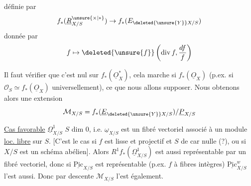 définie par
\[
f_*(\underline R^{\unsure{\times|*}}_{X/S})\to f_*(E_{\deleted{\unsure{Y}}X/S})
\]
donnée par
\[
f\mapsto\deleted{\unsure{f}}\left(\mathrm{div}\,f,\frac{df}{f}\right)
\]

Il faut vérifier que c'est nul sur $f_*(\underline O^*_X)$, cela marche si  $f_*(\underline O_X)$  (p.ex. si $\mathcal O_S\simeq f_*(\underline O_X)$ universellement), ce que nous allons supposer.
Nous obtenons alors une extension
\[
\mathcal M_{X/S}=f_*(\underline E_{\deleted{\unsure{Y}}X/S})/\underline P_{X/S}
\]

\uline{Cas favorable} $\underline{\Omega}^1_{X/S}$  $S$  dim $0$, i.e. $\underline{\omega}_{X/S}$ est un fibré vectoriel associé à un module \uline{loc. libre} sur $S$. [C'est le cas si $f$ est lisse et projectif et $S$ de car nulle (?), ou si $X/S$ est un schéma abélien]. Alors $R^1 f_*(\underline{\Omega}^1_{X/S})$ est aussi représentable par un fibré vectoriel, donc si $\underline{\mathrm{Pic}}_{X/S}$ est représentable (p.ex. $f$ à fibres  intègres) $\underline{\mathrm{Pic}}^w_{X/S}$ l'est aussi. Donc par descente $\mathcal M_{X/S}$ l'est également.

